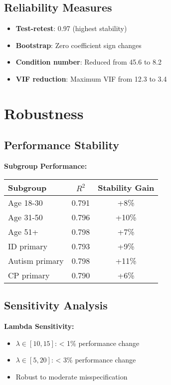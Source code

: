 \subsection{Reliability Measures}

\begin{itemize}
    \item \textbf{Test-retest}: 0.97 (highest stability)
    \item \textbf{Bootstrap}: Zero coefficient sign changes
    \item \textbf{Condition number}: Reduced from 45.6 to 8.2
    \item \textbf{VIF reduction}: Maximum VIF from 12.3 to 3.4
\end{itemize}

\section{Robustness}

\subsection{Performance Stability}

\textbf{Subgroup Performance:}
\begin{center}
\begin{tabular}{lcc}
\toprule
Subgroup & $R^2$ & Stability Gain \\
\midrule
Age 18-30 & 0.791 & +8\% \\
Age 31-50 & 0.796 & +10\% \\
Age 51+ & 0.798 & +7\% \\
\midrule
ID primary & 0.793 & +9\% \\
Autism primary & 0.798 & +11\% \\
CP primary & 0.790 & +6\% \\
\bottomrule
\end{tabular}
\end{center}

\subsection{Sensitivity Analysis}

\textbf{Lambda Sensitivity:}
\begin{itemize}
    \item $\lambda \in [10, 15]$: < 1\% performance change
    \item $\lambda \in [5, 20]$: < 3\% performance change
    \item Robust to moderate misspecification
\end{itemize}

